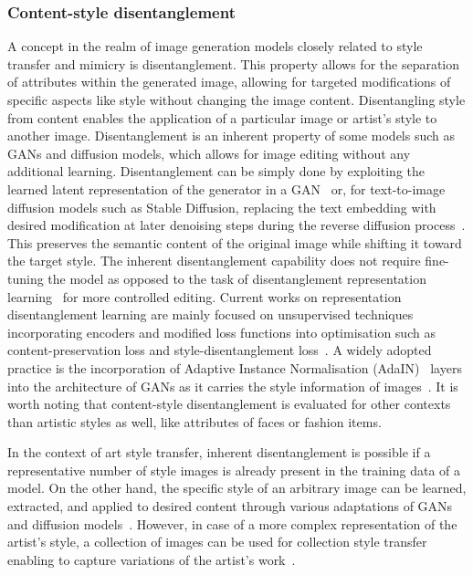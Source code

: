 \documentclass[conference,table]{IEEEtran} %
\begin{document}
\subsubsection{Content-style disentanglement}
A concept in the realm of image generation models closely related to style transfer and mimicry is disentanglement. This property allows for the separation of attributes within the generated image, allowing for targeted modifications of specific aspects like style without changing the image content. Disentangling style from content enables the application of a particular image or artist's style to another image.
Disentanglement is an inherent property of some models such as GANs and diffusion models, which allows for image editing without any additional learning. Disentanglement can be simply done by exploiting the learned latent representation of the generator in a GAN~\cite{collins_editing_2020, harkonen_ganspace_2020} or, for text-to-image diffusion models such as Stable Diffusion, replacing the text embedding with desired modification at later denoising steps during the reverse diffusion process~\cite{wu_uncovering_2023}. This preserves the semantic content of the original image while shifting it toward the target style. The inherent disentanglement capability does not require fine-tuning the model as opposed to the task of disentanglement representation learning~\cite{higgins_towards_2018} for more controlled editing. 
Current works on representation disentanglement learning are mainly focused on unsupervised techniques incorporating encoders and modified loss functions into optimisation such as content-preservation loss and style-disentanglement loss~\cite{yang_disdiff_2023, wang_stylediffusion_2023, kwon_diffusion-based_2023, kazemi_style_2018}. %
A widely adopted practice is the incorporation of Adaptive Instance Normalisation (AdaIN)~\cite{huang_arbitrary_2017} layers into the architecture of GANs as it carries the style information of images~\cite{kazemi_style_2018, kwon_diagonal_2021, xu_drb-gan_2021}.
It is worth noting that content-style disentanglement is evaluated for other contexts than artistic styles as well, like attributes of faces or fashion items.

In the context of art style transfer, inherent disentanglement is possible if a representative number of style images is already present in the training data of a model. On the other hand, the specific style of an arbitrary image can be learned, extracted, and applied to desired content through various adaptations of GANs~\cite{kaneko_cyclegan-vc2_2019, liu_artsy-gan_2018, kazemi_style_2018} and diffusion models~\cite{wang_stylediffusion_2023, wu_not_2023}. However, in case of a more complex representation of the artist's style, a collection of images can be used for collection style transfer enabling to capture variations of the artist's work~\cite{kotovenko_content_2019, xu_drb-gan_2021}.
\end{document}
